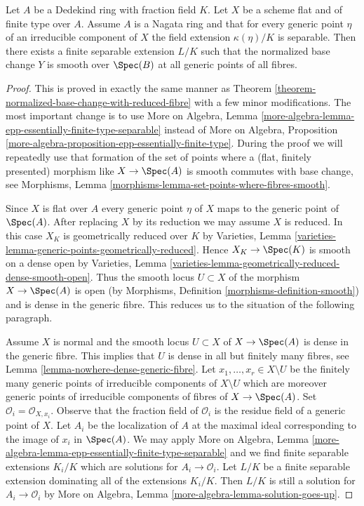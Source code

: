 \begin{lemma}
\label{lemma-normalized-base-change-with-reduced-fibre-separable}
Let $A$ be a Dedekind ring with fraction field $K$.
Let $X$ be a scheme flat and of finite type over $A$.
Assume $A$ is a Nagata ring and that for every generic point
$\eta$ of an irreducible component of $X$ the field
extension $\kappa(\eta)/K$ is separable.
Then there exists a finite separable extension $L/K$ such that
the normalized base change $Y$ is smooth over $\Spec(B)$
at all generic points of all fibres.
\end{lemma}

\begin{proof}
This is proved in exactly the same manner as
Theorem \ref{theorem-normalized-base-change-with-reduced-fibre}
with a few minor modifications. The most important change
is to use More on Algebra, Lemma
\ref{more-algebra-lemma-epp-essentially-finite-type-separable}
instead of More on Algebra, Proposition
\ref{more-algebra-proposition-epp-essentially-finite-type}.
During the proof we will repeatedly use that formation of the set of points
where a (flat, finitely presented) morphism like $X \to \Spec(A)$ is
smooth commutes with base change, see
Morphisms, Lemma \ref{morphisms-lemma-set-points-where-fibres-smooth}.

\medskip\noindent
Since $X$ is flat over $A$ every generic point $\eta$ of $X$ maps to the
generic point of $\Spec(A)$.
After replacing $X$ by its reduction we may assume $X$ is reduced.
In this case $X_K$ is geometrically reduced over $K$
by Varieties, Lemma \ref{varieties-lemma-generic-points-geometrically-reduced}.
Hence $X_K \to \Spec(K)$ is smooth on a dense open by
Varieties, Lemma \ref{varieties-lemma-geometrically-reduced-dense-smooth-open}.
Thus the smooth locus $U \subset X$ of the morphism $X \to \Spec(A)$
is open (by Morphisms, Definition \ref{morphisms-definition-smooth})
and is dense in the generic fibre. This reduces us to the situation
of the following paragraph.

\medskip\noindent
Assume $X$ is normal and the smooth locus $U \subset X$ of $X \to \Spec(A)$
is dense in the generic fibre. This implies that $U$ is dense in all but
finitely many fibres, see Lemma \ref{lemma-nowhere-dense-generic-fibre}.
Let $x_1, \ldots, x_r \in X \setminus U$ be the finitely many generic
points of irreducible components of $X \setminus U$ which are moreover
generic points of irreducible components of fibres of $X \to \Spec(A)$.
Set $\mathcal{O}_i = \mathcal{O}_{X, x_i}$. Observe that the fraction
field of $\mathcal{O}_i$ is the residue field of a generic point of $X$.
Let $A_i$ be the localization of $A$ at the maximal ideal corresponding
to the image of $x_i$ in $\Spec(A)$. We may apply More on Algebra, Lemma
\ref{more-algebra-lemma-epp-essentially-finite-type-separable}
and we find finite separable extensions $K_i/K$ which are
solutions for $A_i \to \mathcal{O}_i$. Let $L/K$ be a finite
separable extension dominating all of the extensions $K_i/K$.
Then $L/K$ is still a solution for $A_i \to \mathcal{O}_i$ by
More on Algebra, Lemma \ref{more-algebra-lemma-solution-goes-up}.


\end{proof}
